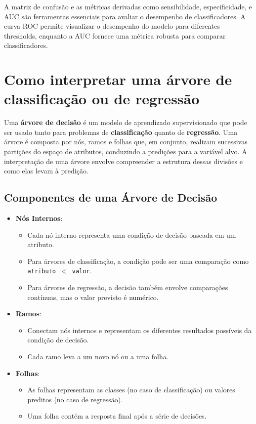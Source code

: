 \documentclass{sciposter}
\begin{document}
\begin{multicols}{3}
A matriz de confusão e as métricas derivadas como sensibilidade, especificidade, e AUC são ferramentas essenciais para avaliar o desempenho de classificadores. A curva ROC permite visualizar o desempenho do modelo para diferentes thresholds, enquanto a AUC fornece uma métrica robusta para comparar classificadores.

\section{Como interpretar uma árvore de classificação ou de regressão}

Uma \textbf{árvore de decisão} é um modelo de aprendizado supervisionado que pode ser usado tanto para problemas de \textbf{classificação} quanto de \textbf{regressão}. Uma árvore é composta por nós, ramos e folhas que, em conjunto, realizam sucessivas partições do espaço de atributos, conduzindo a predições para a variável alvo. A interpretação de uma árvore envolve compreender a estrutura dessas divisões e como elas levam à predição.

\subsection{Componentes de uma Árvore de Decisão}

\begin{itemize}
    \item \textbf{Nós Internos}:
    \begin{itemize}
        \item Cada nó interno representa uma condição de decisão baseada em um atributo.
        \item Para árvores de classificação, a condição pode ser uma comparação como \texttt{atributo $<$ valor}.
        \item Para árvores de regressão, a decisão também envolve comparações contínuas, mas o valor previsto é numérico.
    \end{itemize}
    
    \item \textbf{Ramos}:
    \begin{itemize}
        \item Conectam nós internos e representam os diferentes resultados possíveis da condição de decisão.
        \item Cada ramo leva a um novo nó ou a uma folha.
    \end{itemize}
    
    \item \textbf{Folhas}:
    \begin{itemize}
        \item As folhas representam as classes (no caso de classificação) ou valores preditos (no caso de regressão).
        \item Uma folha contém a resposta final após a série de decisões.
    \end{itemize}
\end{itemize}


\end{multicols}
\end{document}
